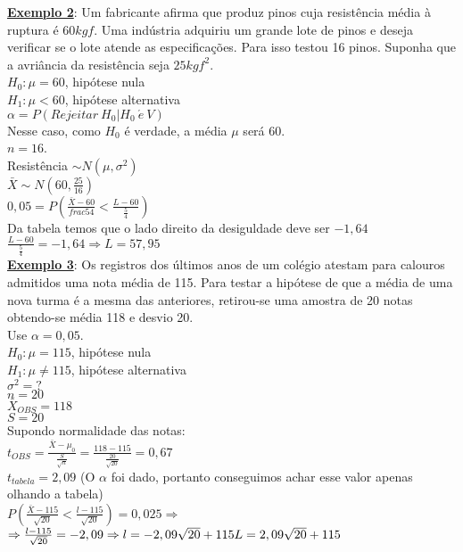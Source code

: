 \documentclass[12pt, oneside]{article}
\begin{document}
\textbf{\underline{Exemplo 2}}: Um fabricante afirma que produz pinos cuja resistência média à ruptura é $60kgf$. Uma indústria adquiriu um grande lote de pinos e deseja verificar se o lote atende as especificações. Para isso testou 16 pinos. Suponha que a avriância da resistência seja $25kgf^2$.\\
$H_0: \mu=60$, hipótese nula\\
$H_1: \mu<60$, hipótese alternativa\\
$\alpha=P(Rejeitar\: H_0|H_0\: \acute{e}\: V)$\\
Nesse caso, como $H_0$ é verdade, a média $\mu$ será $60$.\\
$n=16$.\\
Resistência $\sim N(\mu,\sigma^2)$\\
$\bar{X}\sim N(60, \frac{25}{16})$\\
$0,05 = P(\frac{\bar{X}-60}{frac{5}{4}}<\frac{L-60}{\frac{5}{4}})$\\
Da tabela temos que o lado direito da desiguldade deve ser $-1,64$\\
$\frac{L-60}{\frac{5}{4}}=-1,64\Rightarrow L=57,95$\\
\noindent\textbf{\underline{Exemplo 3}}: Os registros dos últimos anos de um colégio  atestam para calouros admitidos uma nota média de 115. Para testar a hipótese de que a média de uma nova turma é a mesma das anteriores, retirou-se uma amostra de 20 notas obtendo-se média 118 e desvio 20.\\
Use $\alpha=0,05$.\\
$H_0: \mu=115$, hipótese nula\\
$H_1: \mu\neq 115$, hipótese alternativa\\
$\sigma^2=?$\\
$n=20$\\
$\bar{X}_{OBS}=118$\\
$S=20$\\
Supondo normalidade das notas:\\
$t_{OBS}=\frac{\bar{X}-\mu_0}{\frac{S}{\sqrt{n}}}=\frac{118-115}{\frac{20}{\sqrt{20}}}=0,67$\\
$t_{tabela}=2,09$ (O $\alpha$ foi dado, portanto conseguimos achar esse valor apenas olhando a tabela)\\
$P(\frac{\bar{X}-115}{\sqrt{20}}<\frac{l-115}{\sqrt{20}})=0,025\Rightarrow$\\
$\Rightarrow \frac{l-115}{\sqrt{20}}=-2,09\Rightarrow\\ l=-2,09\sqrt{20}+115\\ L=2,09\sqrt{20}+115$\\
\end{document}
